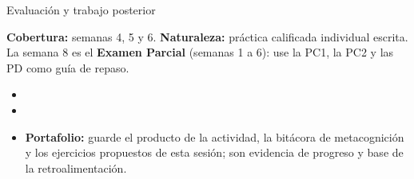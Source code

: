 \documentclass[10pt,aspectratio=169]{beamer}
\begin{document}
\begin{frame}{Evaluación y trabajo posterior}
  \small
  \begin{evalbox}
    \textbf{Cobertura:} semanas 4, 5 y 6. \textbf{Naturaleza:} práctica calificada individual escrita. La semana 8 es el \textbf{Examen Parcial} (semanas 1 a 6): use la PC1, la PC2 y las PD como guía de repaso.
  \end{evalbox}
  \begin{itemize}
    \item \criterios
    \item \declaracionia
    \item \textbf{Portafolio:} guarde el producto de la actividad, la bitácora de metacognición y los ejercicios propuestos de esta sesión; son evidencia de progreso y base de la retroalimentación.
  \end{itemize}
\end{frame}
\end{document}
